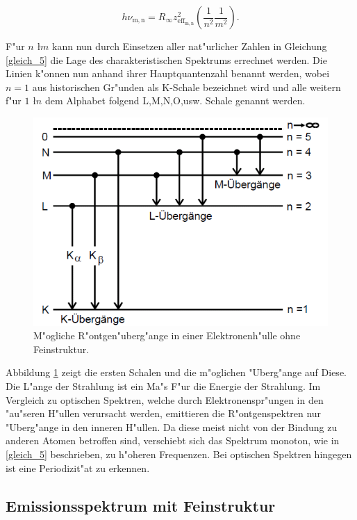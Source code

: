 		\begin{equation}
			h \nu_\mathrm{m,n} = R_\infty z_{\mathrm{eff}_\mathrm{m,n}}^2 \left( \frac{1}{n^2} \frac{1}{m^2} \right). \label{gleich_5}
		\end{equation}

		F"ur $n$ \l $m$ kann nun durch Einsetzen aller nat"urlicher Zahlen in Gleichung \ref{gleich_5} die Lage des charakteristischen Spektrums errechnet werden.
		Die Linien k"onnen nun anhand ihrer Hauptquantenzahl benannt werden, wobei $n = 1$ aus historischen Gr"unden als K-Schale bezeichnet wird und alle weitern f"ur $1$ \l $n$ dem Alphabet folgend L,M,N,O,usw. Schale genannt werden. 

		\begin{figure}[htbp]
			\centering
			\includegraphics[width = 12cm]{img/Roentgenuebergaenge.png}
			\caption{M"ogliche R"ontgen"uberg"ange in einer Elektronenh"ulle ohne Feinstruktur.}
			\label{roentgenuebergaenge}
		\end{figure}	

		Abbildung \ref{roentgenuebergaenge} zeigt die ersten Schalen und die m"oglichen "Uberg"ange auf Diese. Die L"ange der Strahlung ist ein Ma"s F"ur die Energie der Strahlung.
		Im Vergleich zu optischen Spektren, welche durch Elektronenspr"ungen in den "au"seren H"ullen verursacht werden, emittieren die R"ontgenspektren nur "Uberg"ange in den inneren H"ullen.
		Da diese meist nicht von der Bindung zu anderen Atomen betroffen sind, verschiebt sich das Spektrum monoton, wie in \ref{gleich_5} beschrieben, zu h"oheren Frequenzen.
		Bei optischen Spektren hingegen ist eine Periodizit"at zu erkennen.

	\subsection{Emissionsspektrum mit Feinstruktur}
	\label{sub:emissionsspektrum_mit_feinstruktur}
	
